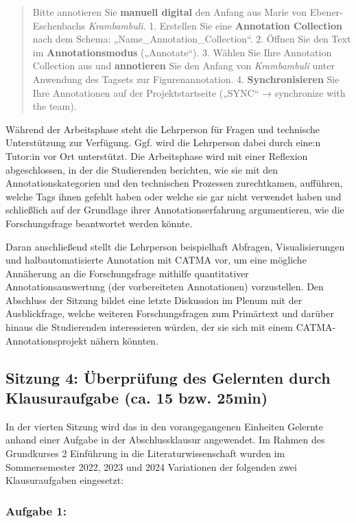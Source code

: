 \documentclass[
          a4paper,
        ]{article}
\begin{document}
\begin{quote}
Bitte annotieren Sie \textbf{manuell digital} den Anfang aus Marie von
Ebener-Eschenbachs \emph{Krambambuli}. 1. Erstellen Sie eine
\textbf{Annotation Collection} nach dem Schema:
„Name\_Annotation\_Collection``. 2. Öffnen Sie den Text im
\textbf{Annotationsmodus} („Annotate``). 3. Wählen Sie Ihre Annotation
Collection aus und \textbf{annotieren} Sie den Anfang von
\emph{Krambambuli} unter Anwendung des Tagsets zur Figurenannotation. 4.
\textbf{Synchronisieren} Sie Ihre Annotationen auf der Projektstartseite
(„SYNC`` → synchronize with the team).
\end{quote}

Während der Arbeitsphase steht die Lehrperson für Fragen und technische
Unterstützung zur Verfügung. Ggf. wird die Lehrperson dabei durch eine:n
Tutor:in vor Ort unterstützt. Die Arbeitsphase wird mit einer Reflexion
abgeschlossen, in der die Studierenden berichten, wie sie mit den
Annotationskategorien und den technischen Prozessen zurechtkamen,
aufführen, welche Tags ihnen gefehlt haben oder welche sie gar nicht
verwendet haben und schließlich auf der Grundlage ihrer
Annotationserfahrung argumentieren, wie die Forschungsfrage beantwortet
werden könnte.

Daran anschließend stellt die Lehrperson beispielhaft Abfragen,
Visualisierungen und halbautomatisierte Annotation mit CATMA vor, um
eine mögliche Annäherung an die Forschungsfrage mithilfe quantitativer
Annotationsauswertung (der vorbereiteten Annotationen) vorzustellen. Den
Abschluss der Sitzung bildet eine letzte Diskussion im Plenum mit der
Ausblickfrage, welche weiteren Forschungsfragen zum Primärtext und
darüber hinaus die Studierenden interessieren würden, der sie sich mit
einem CATMA-Annotationsprojekt nähern könnten.

\subsection{Sitzung 4: Überprüfung des Gelernten durch Klausuraufgabe
(ca. 15 bzw.
25min)}\label{sitzung-4-uxfcberpruxfcfung-des-gelernten-durch-klausuraufgabe-ca.-15-bzw.-25min}

In der vierten Sitzung wird das in den vorangegangenen Einheiten
Gelernte anhand einer Aufgabe in der Abschlussklausur angewendet. Im
Rahmen des Grundkurses 2 Einführung in die Literaturwissenschaft wurden
im Sommersemester 2022, 2023 und 2024 Variationen der folgenden zwei
Klausuraufgaben eingesetzt:

\subsubsection{Aufgabe 1:}\label{aufgabe-1}
\end{document}
